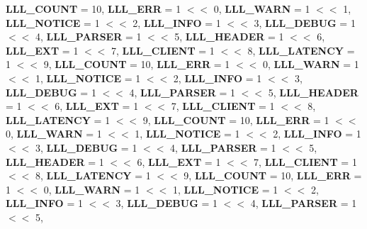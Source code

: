 \begin{DoxyCompactItemize}
{\bfseries L\+L\+L\+\_\+\+C\+O\+U\+NT} = 10, 
{\bfseries L\+L\+L\+\_\+\+E\+RR} = 1 $<$$<$ 0, 
{\bfseries L\+L\+L\+\_\+\+W\+A\+RN} = 1 $<$$<$ 1, 
{\bfseries L\+L\+L\+\_\+\+N\+O\+T\+I\+CE} = 1 $<$$<$ 2, 
\newline
{\bfseries L\+L\+L\+\_\+\+I\+N\+FO} = 1 $<$$<$ 3, 
{\bfseries L\+L\+L\+\_\+\+D\+E\+B\+UG} = 1 $<$$<$ 4, 
{\bfseries L\+L\+L\+\_\+\+P\+A\+R\+S\+ER} = 1 $<$$<$ 5, 
{\bfseries L\+L\+L\+\_\+\+H\+E\+A\+D\+ER} = 1 $<$$<$ 6, 
\newline
{\bfseries L\+L\+L\+\_\+\+E\+XT} = 1 $<$$<$ 7, 
{\bfseries L\+L\+L\+\_\+\+C\+L\+I\+E\+NT} = 1 $<$$<$ 8, 
{\bfseries L\+L\+L\+\_\+\+L\+A\+T\+E\+N\+CY} = 1 $<$$<$ 9, 
{\bfseries L\+L\+L\+\_\+\+C\+O\+U\+NT} = 10, 
\newline
{\bfseries L\+L\+L\+\_\+\+E\+RR} = 1 $<$$<$ 0, 
{\bfseries L\+L\+L\+\_\+\+W\+A\+RN} = 1 $<$$<$ 1, 
{\bfseries L\+L\+L\+\_\+\+N\+O\+T\+I\+CE} = 1 $<$$<$ 2, 
{\bfseries L\+L\+L\+\_\+\+I\+N\+FO} = 1 $<$$<$ 3, 
\newline
{\bfseries L\+L\+L\+\_\+\+D\+E\+B\+UG} = 1 $<$$<$ 4, 
{\bfseries L\+L\+L\+\_\+\+P\+A\+R\+S\+ER} = 1 $<$$<$ 5, 
{\bfseries L\+L\+L\+\_\+\+H\+E\+A\+D\+ER} = 1 $<$$<$ 6, 
{\bfseries L\+L\+L\+\_\+\+E\+XT} = 1 $<$$<$ 7, 
\newline
{\bfseries L\+L\+L\+\_\+\+C\+L\+I\+E\+NT} = 1 $<$$<$ 8, 
{\bfseries L\+L\+L\+\_\+\+L\+A\+T\+E\+N\+CY} = 1 $<$$<$ 9, 
{\bfseries L\+L\+L\+\_\+\+C\+O\+U\+NT} = 10, 
{\bfseries L\+L\+L\+\_\+\+E\+RR} = 1 $<$$<$ 0, 
\newline
{\bfseries L\+L\+L\+\_\+\+W\+A\+RN} = 1 $<$$<$ 1, 
{\bfseries L\+L\+L\+\_\+\+N\+O\+T\+I\+CE} = 1 $<$$<$ 2, 
{\bfseries L\+L\+L\+\_\+\+I\+N\+FO} = 1 $<$$<$ 3, 
{\bfseries L\+L\+L\+\_\+\+D\+E\+B\+UG} = 1 $<$$<$ 4, 
\newline
{\bfseries L\+L\+L\+\_\+\+P\+A\+R\+S\+ER} = 1 $<$$<$ 5, 
{\bfseries L\+L\+L\+\_\+\+H\+E\+A\+D\+ER} = 1 $<$$<$ 6, 
{\bfseries L\+L\+L\+\_\+\+E\+XT} = 1 $<$$<$ 7, 
{\bfseries L\+L\+L\+\_\+\+C\+L\+I\+E\+NT} = 1 $<$$<$ 8, 
\newline
{\bfseries L\+L\+L\+\_\+\+L\+A\+T\+E\+N\+CY} = 1 $<$$<$ 9, 
{\bfseries L\+L\+L\+\_\+\+C\+O\+U\+NT} = 10, 
{\bfseries L\+L\+L\+\_\+\+E\+RR} = 1 $<$$<$ 0, 
{\bfseries L\+L\+L\+\_\+\+W\+A\+RN} = 1 $<$$<$ 1, 
\newline
{\bfseries L\+L\+L\+\_\+\+N\+O\+T\+I\+CE} = 1 $<$$<$ 2, 
{\bfseries L\+L\+L\+\_\+\+I\+N\+FO} = 1 $<$$<$ 3, 
{\bfseries L\+L\+L\+\_\+\+D\+E\+B\+UG} = 1 $<$$<$ 4, 
{\bfseries L\+L\+L\+\_\+\+P\+A\+R\+S\+ER} = 1 $<$$<$ 5, 
\newline

\end{DoxyCompactItemize}
